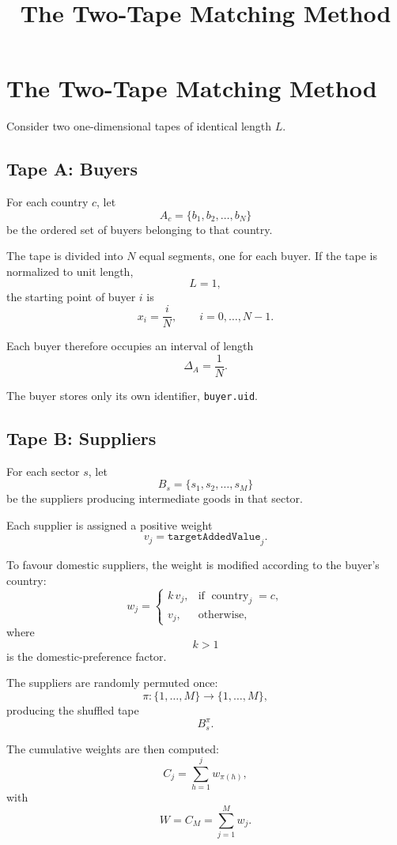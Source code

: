 \documentclass[11pt,a4paper]{article}
\title{The Two-Tape Matching Method}
\author{}
\date{}
\begin{document}
\maketitle

\section{The Two-Tape Matching Method}

Consider two one-dimensional tapes of identical length \(L\).

\subsection{Tape A: Buyers}

For each country \(c\), let
\[
A_c=\{b_1,b_2,\ldots,b_N\}
\]
be the ordered set of buyers belonging to that country.

The tape is divided into \(N\) equal segments, one for each buyer.
If the tape is normalized to unit length,
\[
L=1,
\]
the starting point of buyer \(i\) is
\[
x_i=\frac{i}{N},
\qquad i=0,\ldots,N-1.
\]

Each buyer therefore occupies an interval of length
\[
\Delta_A=\frac{1}{N}.
\]

The buyer stores only its own identifier, \texttt{buyer.uid}.

\subsection{Tape B: Suppliers}

For each sector \(s\), let
\[
B_s=\{s_1,s_2,\ldots,s_M\}
\]
be the suppliers producing intermediate goods in that sector.

Each supplier is assigned a positive weight
\[
v_j=\texttt{targetAddedValue}_j.
\]

To favour domestic suppliers, the weight is modified according to the
buyer's country:
\[
w_j=
\begin{cases}
k\,v_j, & \text{if } \operatorname{country}_j=c,\\[4pt]
v_j, & \text{otherwise},
\end{cases}
\]
where
\[
k>1
\]
is the domestic-preference factor.

The suppliers are randomly permuted once:
\[
\pi:\{1,\ldots,M\}\longrightarrow\{1,\ldots,M\},
\]
producing the shuffled tape
\[
B_s^\pi.
\]

The cumulative weights are then computed:
\[
C_j=\sum_{h=1}^{j} w_{\pi(h)},
\]
with
\[
W=C_M=\sum_{j=1}^{M}w_j.
\]
\end{document}
